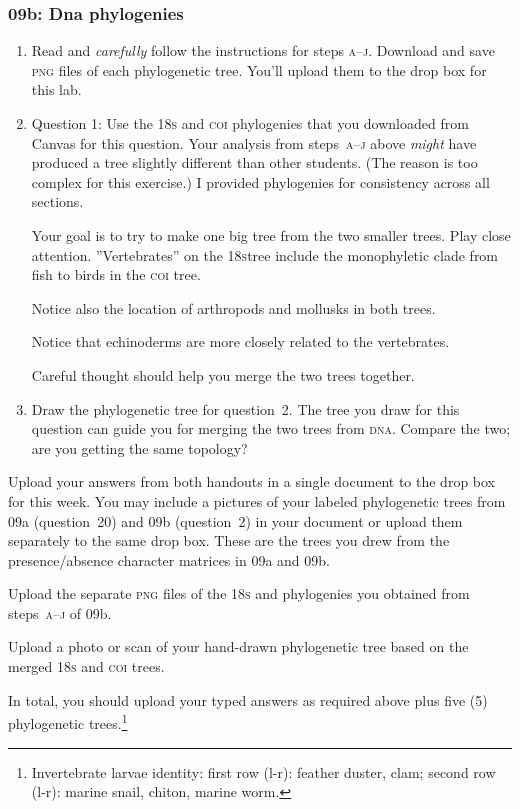 \documentclass[12pt]{exam}
\begin{document}
\subsubsection*{09b: Dna phylogenies}

\begin{enumerate}

\item Read and \emph{carefully} follow the instructions for steps \textsc{a–j}. Download and save \textsc{png} files of each phylogenetic tree. You'll upload them to the drop box for this lab.

\item Question 1: Use the 18\textsc{s} and \textsc{coi} phylogenies that you downloaded from Canvas for this question. Your analysis from steps~\textsc{a–j} above \emph{might} have produced a tree slightly different than other students. (The reason is too complex for this exercise.) I provided phylogenies for consistency across all sections.

Your goal is to try to make one big tree from the two smaller trees. Play close attention. ”Vertebrates” on the 18\textsc{s}tree include the monophyletic clade from fish to birds in the \textsc{coi} tree. 

Notice also the location of arthropods and mollusks in both trees. 

Notice that echinoderms are more closely related to the vertebrates.

Careful thought should help you merge the two trees together.

\item Draw the phylogenetic tree for question~2. The tree you draw for this question can guide you for merging the two trees from \textsc{dna}. Compare the two; are you getting the same topology?

\end{enumerate}

Upload your answers from both handouts in a single document to the drop box for this week. You may include a pictures of your labeled phylogenetic trees from 09a (question~20) and 09b (question~2) in your document or upload them separately to the same drop box. These are the trees you drew from the presence/absence character matrices in 09a and 09b. 

Upload the separate \textsc{png} files of the \textsc{18s} and  phylogenies you obtained from steps~\textsc{a–j} of 09b. 

Upload a photo or scan of your hand-drawn phylogenetic tree based on the merged \textsc{18s} and \textsc{coi} trees.

In total, you should upload your typed answers as required above plus five (5) phylogenetic trees.\footnote{Invertebrate larvae identity: first row (l-r): feather duster, clam; second row (l-r): marine snail, chiton, marine worm.}
\end{document}
